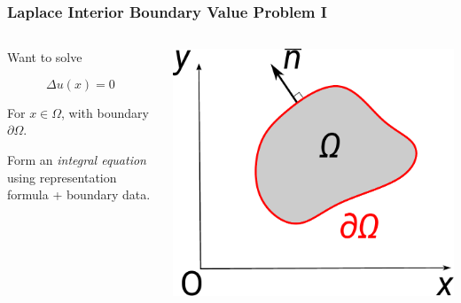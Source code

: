 \begin{frame}
    \frametitle{Laplace Interior Boundary Value Problem I}
    \begin{columns}
        \begin{column}{0.5\textwidth}

            Want to solve

            \begin{equation}
                \Delta u(x) = 0
            \end{equation}

            For $x \in \Omega$, with boundary $\partial \Omega$.


            \hspace*{5pt}

            Form an \textit{integral equation} using representation formula + boundary data.


        \end{column}

        \begin{column}{0.5\textwidth}

        \includegraphics[width=\linewidth]{assets/laplace.pdf}
        \end{column}
    \end{columns}
\end{frame}

